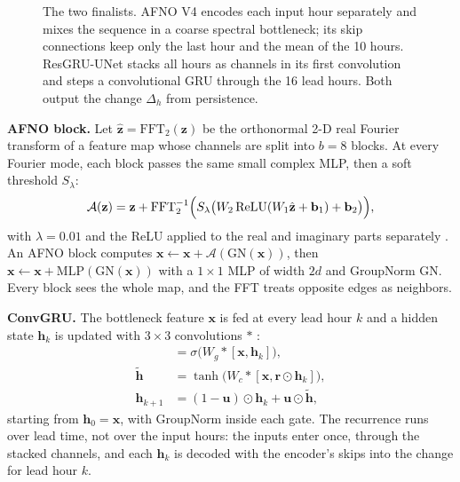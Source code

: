 \documentclass[journal]{IEEEtran}
\begin{document}
\begin{figure}[t]
\caption{The two finalists. AFNO V4 encodes each input hour separately and mixes the sequence in a coarse spectral bottleneck; its skip connections keep only the last hour and the mean of the 10 hours. ResGRU-UNet stacks all hours as channels in its first convolution and steps a convolutional GRU through the 16 lead hours. Both output the change $\Delta_h$ from persistence.}
\label{fig:arch}
\end{figure}

\textbf{AFNO block.} Let $\hat{\mathbf{z}}=\mathrm{FFT}_2(\mathbf{z})$ be the orthonormal 2-D real Fourier transform of a feature map whose channels are split into $b=8$ blocks. At every Fourier mode, each block passes the same small complex MLP, then a soft threshold $S_\lambda$:
\begin{equation}
\mathcal{A}(\mathbf{z}) = \mathbf{z} + \mathrm{FFT}_2^{-1}\Bigl(S_\lambda\bigl(W_2\,\mathrm{ReLU}(W_1\hat{\mathbf{z}}+\mathbf{b}_1)+\mathbf{b}_2\bigr)\Bigr),
\end{equation}
with $\lambda=0.01$ and the ReLU applied to the real and imaginary parts separately \cite{guibas2022afno}. An AFNO block computes $\mathbf{x}\leftarrow\mathbf{x}+\mathcal{A}(\mathrm{GN}(\mathbf{x}))$, then $\mathbf{x}\leftarrow\mathbf{x}+\mathrm{MLP}(\mathrm{GN}(\mathbf{x}))$ with a $1\times1$ MLP of width $2d$ and GroupNorm GN. Every block sees the whole map, and the FFT treats opposite edges as neighbors.

\textbf{ConvGRU.} The bottleneck feature $\mathbf{x}$ is fed at every lead hour $k$ and a hidden state $\mathbf{h}_k$ is updated with $3\times3$ convolutions $*$ \cite{ballas2016convgru}:
\begin{align}
[\mathbf{r},\mathbf{u}] &= \sigma\bigl(W_g * [\mathbf{x},\mathbf{h}_k]\bigr), \\
\tilde{\mathbf{h}} &= \tanh\bigl(W_c * [\mathbf{x},\mathbf{r}\odot\mathbf{h}_k]\bigr), \\
\mathbf{h}_{k+1} &= (1-\mathbf{u})\odot\mathbf{h}_k + \mathbf{u}\odot\tilde{\mathbf{h}},
\end{align}
starting from $\mathbf{h}_0=\mathbf{x}$, with GroupNorm inside each gate. The recurrence runs over lead time, not over the input hours: the inputs enter once, through the stacked channels, and each $\mathbf{h}_{k}$ is decoded with the encoder's skips into the change for lead hour $k$.
\end{document}
